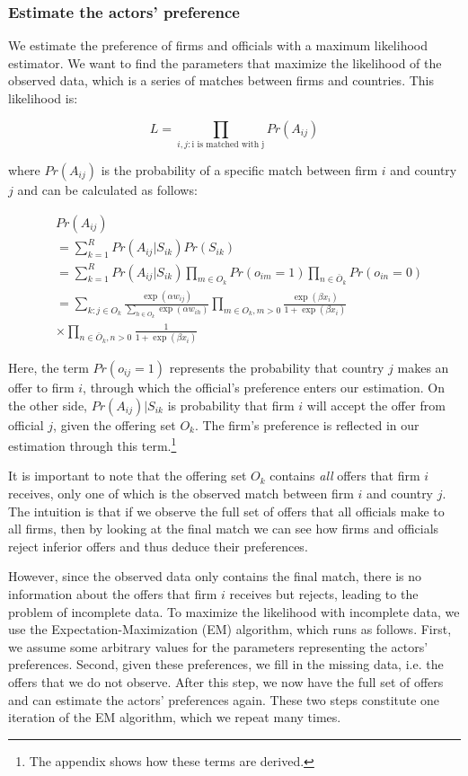 \subsubsection{Estimate the actors' preference}
\label{sec:tsl_estimate}

We estimate the preference of firms and officials with a maximum likelihood estimator. We want to find the parameters that maximize the likelihood of the observed data, which is a series of matches between firms and countries. This likelihood is:

\[
L = \prod_{i,j: \text{i is matched with j}} Pr(A_{ij})
\]

where $Pr(A_{ij})$ is the probability of a specific match between firm $i$ and country $j$ and can be calculated as follows:

\begin{align}
&Pr(A_{ij}) \\
&= \sum_{k=1}^R Pr(A_{ij}|S_{ik}) Pr(S_{ik}) \\
&= \sum_{k=1}^R Pr(A_{ij} | S_{ik}) \prod_{m \in O_k} Pr(o_{im} = 1) \prod_{n \in \bar O_k} Pr(o_{in} = 0) \\
&= \sum_{k:j \in O_k} \frac{\exp(\alpha w_{ij})}{\displaystyle\sum_{h \in O_k} \exp(\alpha w_{ih})} \prod_{m \in O_k, m > 0} \frac{\exp(\beta x_{i})}{1 + \exp(\beta x_i)} \\
&\times \prod_{n \in \bar O_k, n > 0} \frac{1}{1 + \exp(\beta x_i)}
\end{align}

Here, the term $Pr(o_{ij} = 1)$ represents the probability that country $j$ makes an offer to firm $i$, through which the official's preference enters our estimation. On the other side, $Pr(A_{ij}) | S_{ik}$ is probability that firm $i$ will accept the offer from official $j$, given the offering set $O_k$. The firm's preference is reflected in our estimation through this term.\footnote{The appendix shows how these terms are derived.}

It is important to note that the offering set $O_k$ contains \textit{all} offers that firm $i$ receives, only one of which is the observed match between firm $i$ and country $j$. The intuition is that if we observe the full set of offers that all officials make to all firms, then by looking at the final match we can see how firms and officials reject inferior offers and thus deduce their preferences.

However, since the observed data only contains the final match, there is no information about the offers that firm $i$ receives but rejects, leading to the problem of incomplete data. To maximize the likelihood with incomplete data, we use the Expectation-Maximization (EM) algorithm, which runs as follows. First, we assume some arbitrary values for the parameters representing the actors' preferences. Second, given these preferences, we fill in the missing data, i.e. the offers that we do not observe. After this step, we now have the full set of offers and can estimate the actors' preferences again. These two steps constitute one iteration of the EM algorithm, which we repeat many times. 

